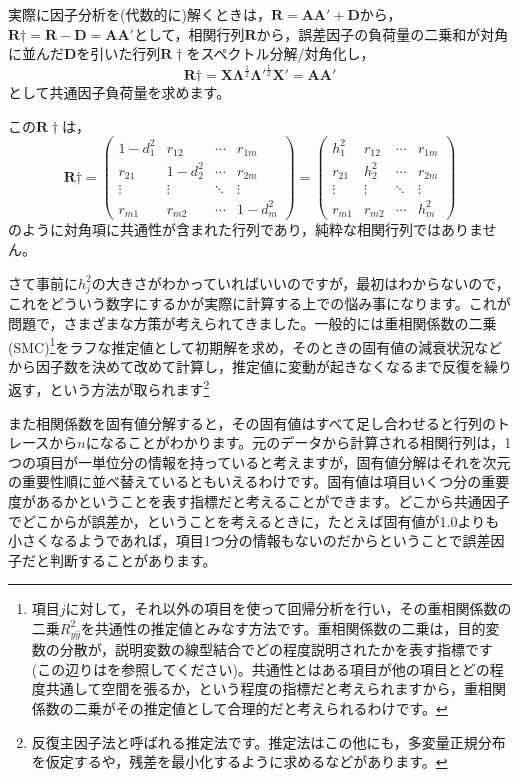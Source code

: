 \documentclass{ltjsbook}
\begin{document}
実際に因子分析を(代数的に)解くときは，$\bm{R} = \bm{AA}'+\bm{D}$から，$\bm{R}\dagger = \bm{R}-\bm{D} = \bm{AA}'$として，相関行列$\bm{R}$から，誤差因子の負荷量の二乗和が対角に並んだ$\bm{D}$を引いた行列$\bm{R}\dagger$をスペクトル分解/対角化し，
\[ \bm{R}\dagger = \bm{X\Lambda}^{\frac{1}{2}}\bm{\Lambda'}^{\frac{1}{2}}\bm{X}' = \bm{AA}'\]
として共通因子負荷量を求めます。

この$\bm{R}\dagger$は，
\[ \bm{R}\dagger = \begin{pmatrix} 1 - d_1^2 & r_{12}  & \cdots & r_{1m}   \\
                r_{21}    & 1-d_2^2 & \cdots & r_{2m}   \\
                \vdots    & \vdots  & \ddots & \vdots   \\
                r_{m1}    & r_{m2}  & \cdots & 1- d_m^2\end{pmatrix}
	= \begin{pmatrix} h_1^2  & r_{12} & \cdots & r_{1m} \\
                r_{21} & h_2^2  & \cdots & r_{2m} \\
                \vdots & \vdots & \ddots & \vdots \\
                r_{m1} & r_{m2} & \cdots & h_m^2\end{pmatrix}
\]
のように対角項に共通性が含まれた行列であり，純粋な相関行列ではありません。

さて事前に$h_j^2$の大きさがわかっていればいいのですが，最初はわからないので，これをどういう数字にするかが実際に計算する上での悩み事になります。これが問題で，さまざまな方策が考えられてきました。一般的には重相関係数の二乗(SMC)\footnote{項目$j$に対して，それ以外の項目を使って回帰分析を行い，その重相関係数の二乗$R_{y\hat{y}}^2$を共通性の推定値とみなす方法です。重相関係数の二乗は，目的変数の分散が，説明変数の線型結合でどの程度説明されたかを表す指標です(この辺りは\parencite{kosugi2018}を参照してください)。共通性とはある項目が他の項目とどの程度共通して空間を張るか，という程度の指標だと考えられますから，重相関係数の二乗がその推定値として合理的だと考えられるわけです。}をラフな推定値として初期解を求め，そのときの固有値の減衰状況などから因子数を決めて改めて計算し，推定値に変動が起きなくなるまで反復を繰り返す，という方法が取られます\footnote{反復主因子法と呼ばれる推定法です。推定法はこの他にも，多変量正規分布を仮定するや，残差を最小化するように求めるなどがあります。}

また相関係数を固有値分解すると，その固有値はすべて足し合わせると行列のトレースから$n$になることがわかります。元のデータから計算される相関行列は，1つの項目が一単位分の情報を持っていると考えますが，固有値分解はそれを次元の重要性順に並べ替えているともいえるわけです。固有値は項目いくつ分の重要度があるかということを表す指標だと考えることができます。どこから共通因子でどこからが誤差か，ということを考えるときに，たとえば固有値が1.0よりも小さくなるようであれば，項目1つ分の情報もないのだからということで誤差因子だと判断することがあります。
\end{document}
